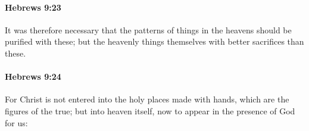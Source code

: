 		\paragraph{Hebrews 9:23} %
			\label{HEBREWS-9-23}

			It was therefore necessary that the patterns of things in the heavens should be purified with these; but the heavenly things themselves with better sacrifices than these.

			\begin{framed}
			\scriptsize
				\begin{compactdesc}
					\item[SBLG] 
				\end{compactdesc}
			\end{framed}

		\paragraph{Hebrews 9:24} %
			\label{HEBREWS-9-24}

			For Christ is not entered into the holy places made with hands, which are the figures of the true; but into heaven itself, now to appear in the presence of God for us:

